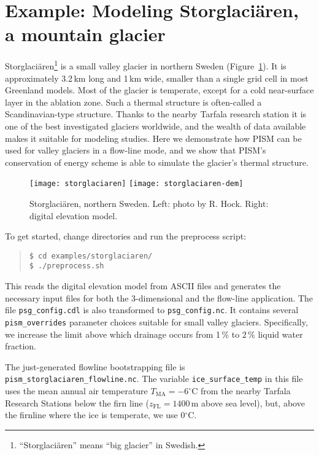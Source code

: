 
\section{Example: Modeling Storglaci{\"a}ren, a mountain glacier}\label{sec:storglaciaren} 

Storglaci{\"a}ren\footnote{``Storglaci{\"a}ren'' means ``big glacier'' in Swedish.} is a small valley glacier in northern Sweden (Figure~\ref{fig:storglaciaren}).  It is approximately 3.2\,km long and 1\,km wide, smaller than a single grid cell in most Greenland models.  Most of the glacier is temperate, except for a cold near-surface layer in the ablation zone.  Such a thermal structure is often-called a Scandinavian-type structure.  Thanks to the nearby Tarfala research station it is one of the best investigated glaciers worldwide, and the wealth of data available makes it suitable for modeling studies.  Here we demonstrate how PISM can be used for valley glaciers in a flow-line mode, and we show that PISM's conservation of energy scheme is able to simulate the glacier's thermal structure.

\begin{figure}[ht]
  \centering
  \texttt{[image: storglaciaren]}\qquad
  \texttt{[image: storglaciaren-dem]}
  \caption{Storglaci{\"a}ren, northern Sweden. Left: photo by R. Hock. Right: digital elevation model.}
  \label{fig:storglaciaren}
\end{figure}

To get started, change directories and run the preprocess script:
\begin{quote}\small
\begin{verbatim}
$ cd examples/storglaciaren/
$ ./preprocess.sh
\end{verbatim}
\normalsize\end{quote}
This reads the digital elevation model from ASCII files and generates the necessary input files for both the 3-dimensional and the flow-line application.  The file \texttt{psg_config.cdl} is also transformed to \texttt{psg_config.nc}.  It contains several \texttt{pism_overrides} parameter choices suitable for small valley glaciers.  Specifically, we increase the limit above which drainage occurs from 1\,\% to 2\,\% liquid water fraction.

The just-generated flowline bootstrapping file is \texttt{pism_storglaciaren_flowline.nc}.  The variable \texttt{ice_surface_temp} in this file uses the mean annual air temperature $T_{\mathrm{MA}}=-6^{\circ}$C from the nearby Tarfala Research Stations below the firn line ($z_{\textrm{FL}} = 1400$\,m above sea level), but, above the firnline where the ice is temperate, we use 0$^{\circ}$C.

